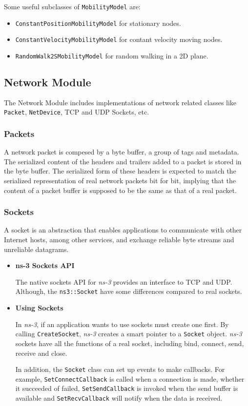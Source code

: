 Some useful subclasses of \texttt{MobilityModel} are:
\begin{itemize}[noitemsep, topsep=0pt]
  \item \texttt{ConstantPositionMobilityModel} for stationary nodes.
  \item \texttt{ConstantVelocityMobilityModel} for contant velocity moving nodes.
  \item \texttt{RandomWalk2SMobilityModel} for random walking in a 2D plane.
\end{itemize}


\subsection{Network Module}
The Network Module includes implementations of network related classes like 
\texttt{Packet}, \texttt{NetDevice}, TCP and UDP Sockets, etc.

\subsubsection{Packets}
A network packet is compesed by a byte buffer, a group of tags and metadata.
The serialized content of the headers and trailers added to a packet is stored in the byte buffer. 
The serialized form of these headers is expected to match the serialized representation of real 
network packets bit for bit, implying that the content of a packet buffer is supposed to be the 
same as that of a real packet.

\subsubsection{Sockets}
A socket is an abstraction that enables applications to communicate with other Internet hosts, among other services,
and exchange reliable byte streams and unreliable datagrams.

\begin{itemize}
  \item \textbf{ns-3 Sockets API} 
  
  The native sockets API for \textit{ns-3} provides an interface 
  to TCP and UDP. Although, the \texttt{ns3::Socket} have some differences compared to
  real sockets. 

  \item \textbf{Using Sockets} 

  In \textit{ns-3}, if an application wants to use sockets must create one first. By 
  calling \texttt{CreateSocket}, \textit{ns-3} creates a smart pointer to a \texttt{Socket} object.
  \textit{ns-3} sockets have all the functions of a real socket, including bind, connect, send, receive
  and close.

  In addition, the \texttt{Socket} class can set up events to make callbacks. For example, 
  \texttt{SetConnectCallback} is called when a connection is made, whether it succeeded of 
  failed, \texttt{SetSendCallback} is invoked when the send buffer is available
  and \texttt{SetRecvCallback} will notify when the data is received.
\end{itemize}

